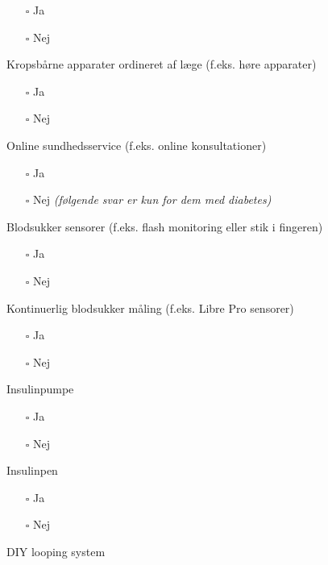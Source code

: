 \documentclass[
]{article}
\providecommand{\tightlist}{%
  \setlength{\itemsep}{0pt}\setlength{\parskip}{0pt}}
\begin{document}
\begin{itemize}
\tightlist
\item[$\square$]
  Ja
\item[$\square$]
  Nej
\end{itemize}

Kropsbårne apparater ordineret af læge (f.eks. høre apparater)

\begin{itemize}
\tightlist
\item[$\square$]
  Ja
\item[$\square$]
  Nej
\end{itemize}

Online sundhedsservice (f.eks. online konsultationer)

\begin{itemize}
\tightlist
\item[$\square$]
  Ja
\item[$\square$]
  Nej \emph{(følgende svar er kun for dem med diabetes)}
\end{itemize}

Blodsukker sensorer (f.eks. flash monitoring eller stik i fingeren)

\begin{itemize}
\tightlist
\item[$\square$]
  Ja
\item[$\square$]
  Nej
\end{itemize}

Kontinuerlig blodsukker måling (f.eks. Libre Pro sensorer)

\begin{itemize}
\tightlist
\item[$\square$]
  Ja
\item[$\square$]
  Nej
\end{itemize}

Insulinpumpe

\begin{itemize}
\tightlist
\item[$\square$]
  Ja
\item[$\square$]
  Nej
\end{itemize}

Insulinpen

\begin{itemize}
\tightlist
\item[$\square$]
  Ja
\item[$\square$]
  Nej
\end{itemize}

DIY looping system
\end{document}
